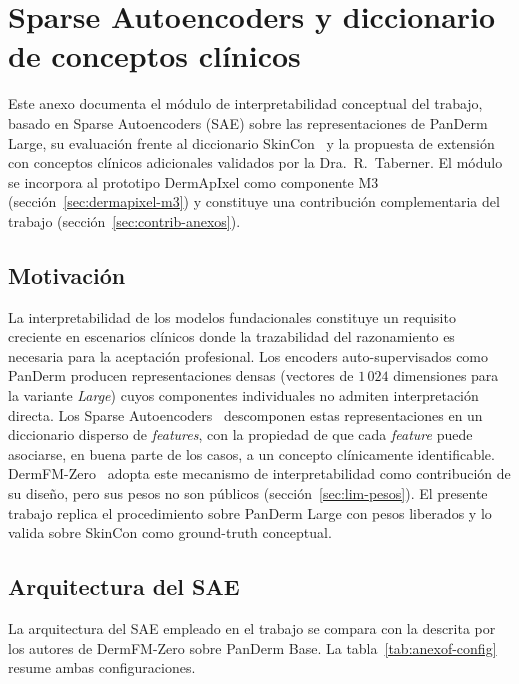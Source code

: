 
\chapter{Sparse Autoencoders y diccionario de conceptos clínicos}
\label{cap:anexof}

Este anexo documenta el módulo de interpretabilidad conceptual del
trabajo, basado en Sparse Autoencoders (SAE) sobre las
representaciones de PanDerm Large, su evaluación frente al
diccionario SkinCon~\cite{skincon} y la propuesta de extensión
con conceptos clínicos adicionales validados por la
Dra.~R.~Taberner. El módulo se incorpora al prototipo DermApIxel
como componente M3 (secci\'on~\ref{sec:dermapixel-m3}) y constituye una
contribución complementaria del trabajo
(secci\'on~\ref{sec:contrib-anexos}).

\section{Motivación}
\label{sec:anexof-motivacion}

La interpretabilidad de los modelos fundacionales constituye un
requisito creciente en escenarios clínicos donde la trazabilidad
del razonamiento es necesaria para la aceptación profesional. Los
encoders auto-supervisados como PanDerm producen representaciones
densas (vectores de $1\,024$ dimensiones para la variante
\emph{Large}) cuyos componentes individuales no admiten
interpretación directa. Los Sparse
Autoencoders~\cite{templeton2024} descomponen estas
representaciones en un diccionario disperso de \emph{features},
con la propiedad de que cada \emph{feature} puede asociarse, en
buena parte de los casos, a un concepto clínicamente
identificable. DermFM-Zero~\cite{dermfmzero2026} adopta este
mecanismo de interpretabilidad como contribución de su diseño,
pero sus pesos no son públicos (secci\'on~\ref{sec:lim-pesos}). El
presente trabajo replica el procedimiento sobre PanDerm Large con
pesos liberados y lo valida sobre SkinCon como ground-truth
conceptual.

\section{Arquitectura del SAE}
\label{sec:anexof-arquitectura}

La arquitectura del SAE empleado en el trabajo se compara con la
descrita por los autores de DermFM-Zero sobre PanDerm Base. La
tabla~\ref{tab:anexof-config} resume ambas configuraciones.

